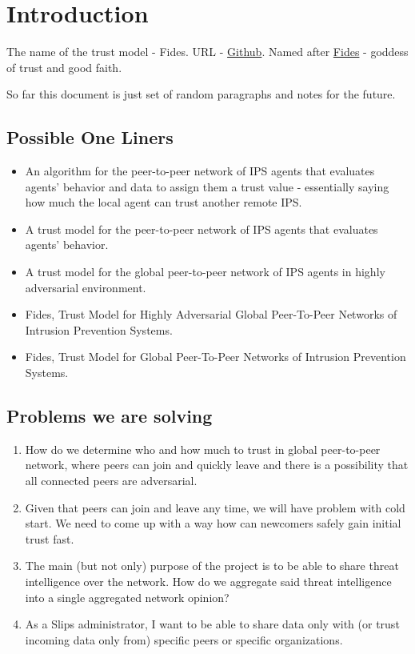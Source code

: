 \chapter{Introduction}
\label{ch:introduction}



The name of the trust model - Fides. URL - \href{https://github.com/LukasForst/fides}{Github}.
Named after \href{https://en.wikipedia.org/wiki/Fides_(deity)}{Fides} - goddess of trust and good faith.

So far this document is just set of random paragraphs and notes for the future.

\section{Possible One Liners}
\begin{itemize}
\item An algorithm for the peer-to-peer network of IPS agents that evaluates agents’ behavior and data to assign them a trust value - essentially saying how much the local agent can trust another remote IPS.
\item A trust model for the peer-to-peer network of IPS agents that evaluates agents’ behavior.
\item A trust model for the global peer-to-peer network of IPS agents in highly adversarial environment.
\item Fides, Trust Model for Highly Adversarial Global Peer-To-Peer Networks of Intrusion Prevention Systems.
\item Fides, Trust Model for Global Peer-To-Peer Networks of Intrusion Prevention Systems.
\end{itemize}

\section{Problems we are solving}
\begin{enumerate}
\item How do we determine who and how much to trust in global peer-to-peer network, where peers can join and quickly leave and there is a possibility that all connected peers are adversarial.
\item Given that peers can join and leave any time, we will have problem with cold start. We need to come up with a way how can newcomers safely gain initial trust fast.
\item The main (but not only) purpose of the project is to be able to share threat intelligence over the network. How do we aggregate said threat intelligence into a single aggregated network opinion?
\item As a Slips administrator, I want to be able to share data only with (or trust incoming data only from) specific peers or specific organizations.
\end{enumerate}